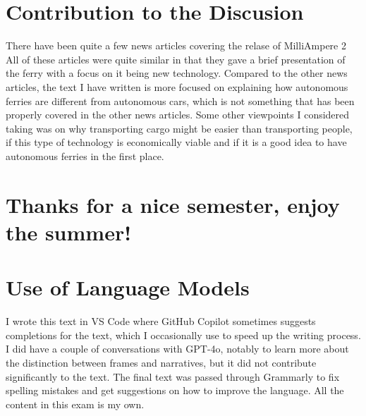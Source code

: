 \documentclass{iopconfser}
\begin{document}
\section*{Contribution to the Discusion}
There have been quite a few news articles covering the relase of MilliAmpere 2
\cite{fjeldSelvstyrtFerjeVekker2022}
\cite{andreassenNorskSelvkjorendeFerje2022a}
\cite{tranaHaperSmaOg2019}
\cite{okstadTilSommerenVil2020}
\cite{auneDetteHarAldri2022}
\cite{killingbergTrengerMillionerBli2022}
\cite{riestoSelvkjoRendeByferje2022}
\cite{hauglandDetSomHar2022}
\cite{skoglundAvtalenKlarOm2024}
\cite{hauganSelvkjorendeFergeForst2022}
All of these articles were quite similar in that they gave a brief presentation of the ferry with a focus on it being new technology.
Compared to the other news articles, the text I have written is more focused on explaining how autonomous ferries are different from autonomous cars, which is not something that has been properly covered in the other news articles.
Some other viewpoints I considered taking was on why transporting cargo might be easier than transporting people, if this type of technology is economically viable and if it is a good idea to have autonomous ferries in the first place.


\section*{Thanks for a nice semester, enjoy the summer!}

\pagebreak
\section*{Use of Language Models}
I wrote this text in VS Code where GitHub Copilot sometimes suggests completions for the text, which I occasionally use to speed up the writing process.
I did have a couple of conversations with GPT-4o, notably to learn more about the distinction between frames and narratives, but it did not contribute significantly to the text.
The final text was passed through Grammarly to fix spelling mistakes and get suggestions on how to improve the language.
All the content in this exam is my own.

\printbibliography
\end{document}
